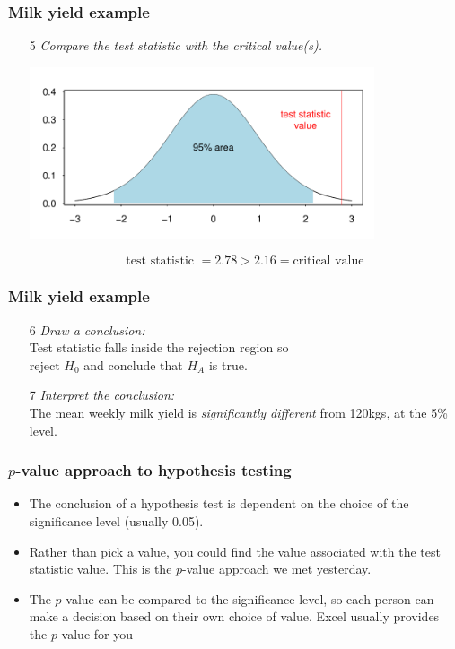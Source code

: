 \documentclass[12pt,xcolor=dvipsnames,handout,mathserif,aspectratio=169]{beamer}
\begin{document}
\begin{frame}\frametitle{Milk yield example}
\begin{enumerate}
\item[5] \emph{Compare the test statistic with the critical value(s).}
\begin{center}
\includegraphics[width=0.8\textwidth]{t_plot2.pdf}
\end{center}
$$\mbox{test statistic } = 2.78 > 2.16 = \mbox{critical value}$$
    \end{enumerate}
\end{frame}

\begin{frame}\frametitle{Milk yield example}
\begin{enumerate}
\item[6] \emph{Draw a conclusion:}\\
\vspace{0.5cm}
Test statistic falls inside the rejection region so\\ reject $H_0$ and conclude that $H_A$ is true. \\
\item[7] \emph{Interpret the conclusion:}\\
\vspace{0.5cm}
The mean weekly milk yield is \emph{significantly different} from 120kgs, at the 5\% level.
    \end{enumerate}
\end{frame}

\begin{frame}
\frametitle{$p$-value approach to hypothesis testing}
\begin{itemize}
\item The conclusion of a hypothesis test is dependent on the choice of the significance level (usually 0.05).
\item Rather than pick a value, you could find the value associated with the test statistic value. This is the $p$-value approach we met yesterday.
\item The $p$-value can be compared to the significance level, so each person can make a decision based on their own choice of value. Excel usually provides the $p$-value for you
\end{itemize}
\end{frame}
\end{document}
